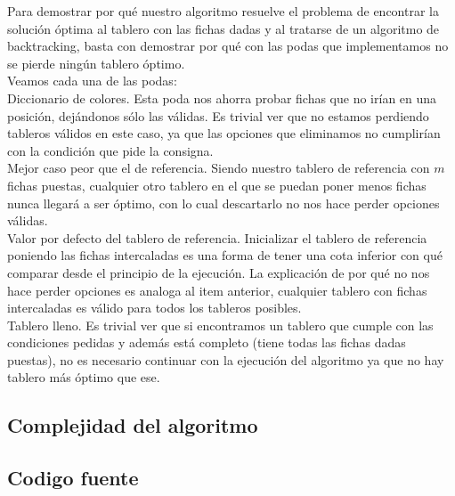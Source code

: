 Para demostrar por qu\'e nuestro algoritmo resuelve el problema de encontrar la soluci\'on \'optima al tablero con las fichas dadas y al tratarse de un algoritmo de backtracking, basta con demostrar por qu\'e con las podas que implementamos no se pierde ning\'un tablero \'optimo.\\

Veamos cada una de las podas:\\

Diccionario de colores. Esta poda nos ahorra probar fichas que no ir\'ian en una posici\'on, dej\'andonos s\'olo las v\'alidas. Es trivial ver que no estamos perdiendo tableros v\'alidos en este caso, ya que las opciones que eliminamos no cumplir\'ian con la condici\'on que pide la consigna.\\

Mejor caso peor que el de referencia. Siendo nuestro tablero de referencia con $m$ fichas puestas, cualquier otro tablero en el que se puedan poner menos fichas nunca llegar\'a a ser \'optimo, con lo cual descartarlo no nos hace perder opciones v\'alidas.\\

Valor por defecto del tablero de referencia. Inicializar el tablero de referencia poniendo las fichas intercaladas es una forma de tener una cota inferior con qu\'e comparar desde el principio de la ejecuci\'on. La explicaci\'on de por qu\'e no nos hace perder opciones es analoga al item anterior, cualquier tablero con fichas intercaladas es v\'alido para todos los tableros posibles. \\

Tablero lleno. Es trivial ver que si encontramos un tablero que cumple con las condiciones pedidas y adem\'as est\'a completo (tiene todas las fichas dadas puestas), no es necesario continuar con la ejecuci\'on del algoritmo ya que no hay tablero m\'as \'optimo que ese.\\

\subsection{Complejidad del algoritmo}

\newpage

\subsection{Codigo fuente}

